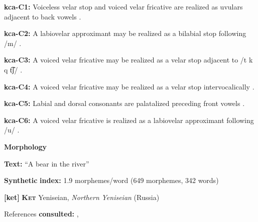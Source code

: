 \documentclass[output=paper]{langsci/langscibook}
\begin{document}
\begin{styleBody}
\textbf{kca-C1:} Voiceless velar stop and voiced velar fricative are realized as uvulars adjacent to back vowels \citep[41]{Filchenko2007}.
\end{styleBody}

\begin{styleBody}
\textbf{kca-C2:} A labiovelar approximant may be realized as a bilabial stop following /m/ \citep[44-45]{Filchenko2007}.
\end{styleBody}

\begin{styleBody}
\textbf{kca-C3:} A voiced velar fricative may be realized as a velar stop adjacent to /t k q t͡ʃ/ \citep[45]{Filchenko2007}.
\end{styleBody}

\begin{styleBody}
\textbf{kca-C4:} A voiced velar fricative may be realized as a velar stop intervocalically \citep[45]{Filchenko2007}.
\end{styleBody}

\begin{styleBody}
\textbf{kca-C5:} Labial and dorsal consonants are palatalized preceding front vowels \citep[37]{Filchenko2007}.
\end{styleBody}

\begin{styleBody}
\textbf{kca-C6:} A voiced velar fricative is realized as a labiovelar approximant following /u/ \citep[45-6]{Filchenko2007}.
\end{styleBody}

\begin{styleBody}
\textbf{Morphology}
\end{styleBody}

\begin{styleBody}
\textbf{Text:} “A bear in the river” \citep[582-588]{Filchenko2007}
\end{styleBody}

\begin{styleBody}
\textbf{Synthetic} \textbf{index:} 1.9 morphemes/word (649 morphemes, 342 words)
\end{styleBody}

\begin{styleBody}
\textbf{[ket]}   \textbf{\textsc{Ket}}  Yeniseian, \textit{Northern} \textit{Yeniseian} (Russia)
\end{styleBody}

\begin{styleBody}
References \textbf{consulted:} \citet{Georg2007}, \citet{Vajda2000}
\end{styleBody}
\end{document}
